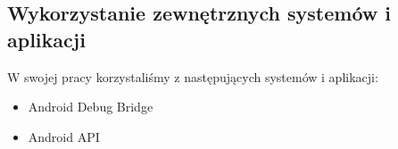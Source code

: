 \subsection{Wykorzystanie zewnętrznych systemów i aplikacji}
W swojej pracy korzystaliśmy z następujących systemów i aplikacji:
\begin{itemize}
    \item Android Debug Bridge
    \item Android API
\end{itemize}
